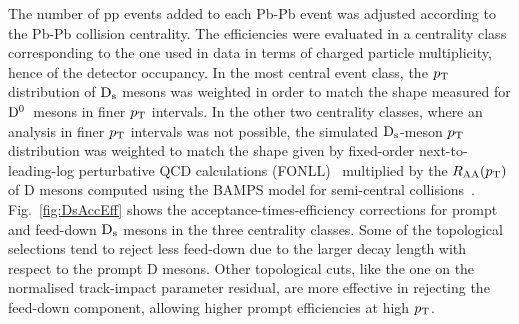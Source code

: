 The number of pp events added to each Pb-Pb 
event was adjusted according to the Pb-Pb collision centrality. 
The efficiencies were evaluated in a centrality class 
corresponding to the one used in 
data in terms of charged particle 
multiplicity, hence of the detector occupancy.
In the most central event class, the $p_{\rm T}$ distribution 
of ${\rm D_s}$ mesons was weighted in order to match the 
shape measured for \mbox{$\rm D^0$ mesons} in finer 
$p_{\rm T}$ intervals. In the other two centrality classes, 
where an analysis in finer $p_{\rm T}$ intervals was not possible, 
the simulated ${\rm D_s}$-meson $p_{\rm T}$ distribution was weighted 
to match the shape given by fixed-order next-to-leading-log 
perturbative QCD calculations (FONLL)~\cite{Cacciari:1998it,Cacciari:2001td} 
multiplied by the $R_{\rm AA}(p_{\rm T})$ of D mesons computed 
using the BAMPS model for semi-central 
collisions~\cite{Uphoff:2011ad,Fochler:2011en,Uphoff:2012gb}.
Fig.~\ref{fig:DsAccEff} shows the acceptance-times-efficiency 
corrections for prompt and feed-down ${\rm D_s}$ mesons in the three
centrality classes.
Some of the topological selections tend to reject 
less feed-down due to the larger 
decay length with respect to the prompt D mesons. 
Other topological cuts, like the one on the normalised 
track-impact parameter residual, are more effective
in rejecting the feed-down component, allowing higher 
prompt efficiencies at high $p_{\rm T}$.


